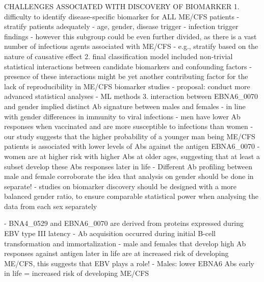 CHALLENGES ASSOCIATED WITH DISCOVERY OF BIOMARKER
    1. difficulty to identify disease-specific biomarker for ALL ME/CFS patients
            - stratify patients adequately
            - age, gender, disease trigger
            - infection trigger findings \citep{domingues2021HerpesvirusesSerologya, steiner2020AutoimmunityRelatedRisk, szklarski2021DelineatingAssociationa}
            - however this subgroup could be even further divided, as there is a vast number of infectious agents associated with ME/CFS \citep{blombergAntibodiesHumanHerpesviruses2019, rasa2018ChronicViral}
                    - e.g., stratify based on the nature of causative effect
    2. final classification model included non-trivial statistical interactions between candidate biomarkers and confounding factors
            - presence of these interactions might be yet another contributing factor for the lack of reproducibility in ME/CFS biomarker studies
                    - proposal: conduct more advanced statistical analyses 
                    - ML methods \citep{gupta2021ArtificialIntelligence}
    3. interaction between EBNA6\_0070 and gender implied distinct Ab signature between males and females
            - in line with gender differences in immunity to viral infections \citep{jacobsen2021SexDifferences}
                    - men have lower Ab responses when vaccinated and are more susceptible to infections than women \citep{aaby2020NonspecificSexdifferential}
            - our study suggests that the higher probability of a younger man being ME/CFS patients is associated with lower levels of Abs against the antigen EBNA6\_0070
            - women are at higher risk with higher Abs at older ages, suggesting that at least a subset develop these Abs responses later in life
        - Different Ab profiling between male and female corroborate the idea that analysis on gender should be done in separate!
            - studies on biomarker discovery should be designed with a more balanced gender ratio, to ensure comparable statistical power when analysing the data from each sex separately

- BNA4\_0529 and EBNA6\_0070 are derived from proteins expressed during EBV type III latency
    - Ab acquisition occurred during initial B-cell transformation and immortalization
    - male and females that develop high Ab responses against antigen later in life are at increased risk of developing ME/CFS, this suggests that EBV plays a role!
            - Males: lower EBNA6 Abs early in life = increased risk of developing ME/CFS

